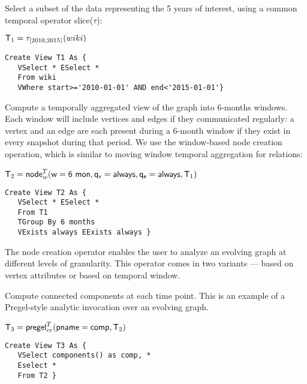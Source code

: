 \begin{example}
\label{ex:slice}

Select a subset of the data representing the 5 years of interest,
using a common temporal operator slice($\tau$):

$\mathsf{T}_1 = \tau_{[2010,2015)}(wiki)$

\begin{small} 
\begin{verbatim}
Create View T1 As { 
   VSelect * ESelect *
   From wiki
   VWhere start>='2010-01-01' AND end<'2015-01-01'}
\end{verbatim}
\end{small}

\end{example}

\begin{example}
\label{ex:nodecrt}

Compute a temporally aggregated view of the graph into 6-months
windows.  Each window will include vertices and edges if they
communicated regularly: a vertex and an edge are each present during a
6-month window if they exist in every snapshot during that period.  We
use the window-based node creation operation, which is similar to
moving window temporal aggregation for relations:


$\mathsf{T}_2 = \textsf{node}^T_w(\mathsf{w=6~mon},\mathsf{q_v=always},\mathsf{q_e=always},\mathsf{T}_1)$

\begin{small} 
\begin{verbatim}
Create View T2 As { 
   VSelect * ESelect *
   From T1
   TGroup By 6 months
   VExists always EExists always }
\end{verbatim}
\end{small}

\end{example}

The node creation operator enables the user to analyze an evolving
graph at different levels of granularity.  This operator comes in two
variants --- based on vertex attributes or based on temporal window.

\begin{example}
\label{ex:cc}

Compute connected components at each time point.  This is an
  example of a Pregel-style analytic invocation over an evolving
  graph.

$\mathsf{T}_3 = \textsf{pregel}^T_{cc} (\mathsf{pname=comp}, \mathsf{T}_2)$

\begin{small} 
\begin{verbatim}
Create View T3 As { 
   VSelect components() as comp, *
   Eselect *
   From T2 }
\end{verbatim}
\end{small}

\end{example}

